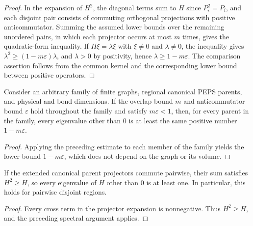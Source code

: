 \begin{proof}\leanok
    In the expansion of $H^2$, the diagonal terms sum to $H$ since
    $P_i^2=P_i$, and each disjoint pair consists of commuting orthogonal
    projections with positive anticommutator. Summing the assumed lower bounds
    over the remaining unordered pairs, in which each projector occurs
    at most $m$ times, gives the quadratic-form inequality.
    If $H\xi=\lambda\xi$ with $\xi\ne0$ and $\lambda\ne0$, the
    inequality gives $\lambda^2\ge(1-m\varepsilon)\lambda$, and
    $\lambda>0$ by positivity, hence $\lambda\ge1-m\varepsilon$.
    The comparison assertion follows from the common kernel and
    the corresponding lower bound between positive operators.
\end{proof}

\begin{corollary}%
    \label{cor:peps_uniform_finite_overlap_gap}
    \leanok
    Consider an arbitrary family of finite graphs, regional canonical
    PEPS parents, and physical and bond dimensions.
    If the overlap bound $m$ and anticommutator bound $\varepsilon$
    hold throughout the family and satisfy $m\varepsilon<1$,
    then, for every parent in the family, every eigenvalue other than
    $0$ is at least the same positive number $1-m\varepsilon$.
\end{corollary}

\begin{proof}\leanok
    Applying the preceding estimate to each member of the family yields the
    lower bound $1-m\varepsilon$, which does not depend on the graph or its
    volume.
\end{proof}

\begin{lemma}%
    \label{thm:peps_commuting_region_parent_unit_gap}
    \leanok
    If the extended canonical parent projectors commute pairwise,
    their sum satisfies $H^2\ge H$, so every eigenvalue of $H$ other
    than $0$ is at least one. In particular, this holds for
    pairwise disjoint regions.
\end{lemma}

\begin{proof}\leanok
    Every cross term in the projector expansion is nonnegative.
    Thus $H^2\ge H$, and the preceding spectral argument applies.
\end{proof}
